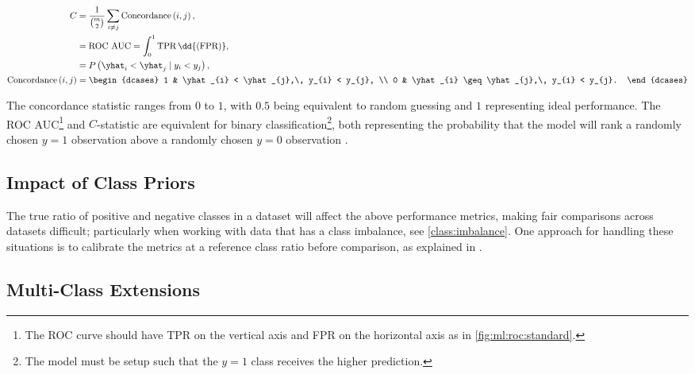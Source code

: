 \begin{subequations} \label{eq:concordance}
\begin{align}
C &= \frac{1}{ \binom{m}{2} } \sum_{i \neq j} \text{Concordance}\left(i, j\right), \label{eq:concordance:C} \\
&= \text{ROC AUC} = \int_{0}^{1} \text{TPR}\, \dd{\left(\text{FPR}\right)}, \label{eq:concordance:ROC_AUC} \\
&= P\left(\yhat_{i} < \yhat_{j} \mid y_{i} < y_{j} \right), \label{eq:concordance:P} \\
\text{Concordance}\left(i, j\right) &= \begin{dcases}
1 & \yhat_{i} < \yhat_{j},\, y_{i} < y_{j}, \\
0 & \yhat_{i} \geq \yhat_{j},\, y_{i} < y_{j}.
\end{dcases} \label{eq:concordance:concordance} \\
\end{align}
\end{subequations}

The concordance statistic ranges from $0$ to $1$,
with $0.5$ being equivalent to random guessing and $1$ representing ideal performance.
The ROC AUC\footnote{The ROC curve should have TPR on the vertical axis and FPR on the horizontal axis as in \cref{fig:ml:roc:standard}.} and $C$-statistic are equivalent for
binary classification\footnote{The model must be setup such that the $y=1$ class receives the higher \yhat prediction.},
both representing the probability that
the model will rank a randomly chosen $y=1$ observation above a randomly chosen $y=0$ observation \cite{Hand2001,Fawcett2006861}.

\subsection{Impact of Class Priors}
\label{ml_general:eval:class_priors}

The true ratio of positive and negative classes in a dataset
will affect the above performance metrics,
making fair comparisons across datasets difficult;
particularly when working with data that has a class imbalance, see \cref{class:imbalance}.
One approach for handling these situations is to calibrate the metrics
at a reference class ratio before comparison,
as explained in \cite{1909.02827}.

\subsection{Multi-Class Extensions}
\label{ml_general:eval:multi_class}

